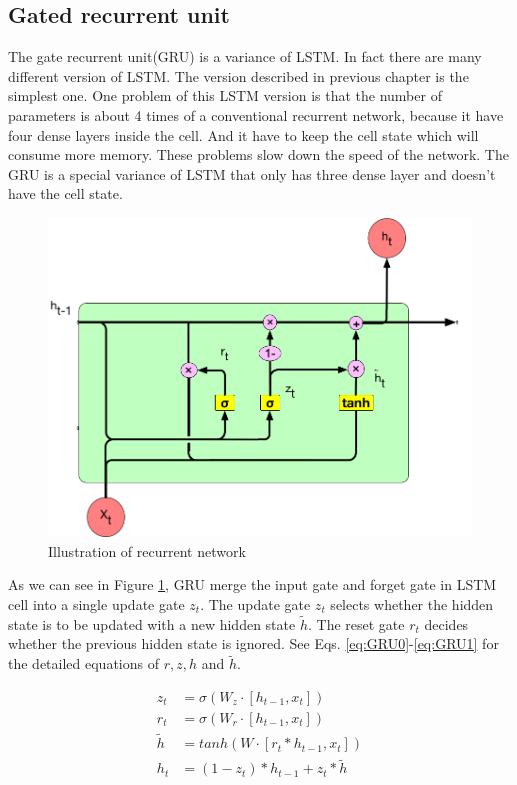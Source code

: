 \par


\subsection{Gated recurrent unit}
\par
The gate recurrent unit(GRU)\cite{cho2014learning} is a variance of LSTM. In fact there are many different version of LSTM. The version described in previous chapter is the simplest one. One problem of this LSTM version is that the number of parameters is about 4 times of a conventional recurrent network, because it have four dense layers inside the cell. And it have to keep the cell state which will consume more memory. These problems slow down the speed of the network. The GRU is a special variance of LSTM that only has three dense layer and doesn't have the cell state.\par

\begin{figure}[h] 
	\centering
	\includegraphics[width=6.0in]{Figures/recurrent5}
	\caption[unrolled recurrent network]{Illustration of recurrent network}
	\label{fig:4}
\end{figure}

As we can see in Figure \ref{fig:4}, GRU merge the input gate and forget gate in LSTM cell into a single update gate $z_t$. The update gate $z_t$ selects whether the hidden state is to be updated with
a new hidden state $\tilde{h}$. The reset gate $r_t$ decides whether the previous hidden state is ignored. See Eqs. \ref{eq:GRU0}-\ref{eq:GRU1} for the detailed equations of $r, z, h$ and $\tilde{h}$.

\begin{subequations} 
    \begin{align}
    	z_t &= \sigma(W_z\cdot [h_{t-1}, x_t]) \label{eq:GRU0}\\ 
        r_t &= \sigma(W_r\cdot [h_{t-1}, x_t]) \label{eq:GRU1}\\
        \tilde{h} &= tanh(W\cdot [r_t\ast h_{t-1}, x_t]) \label{eq:GRU2}\\
        h_t &= (1 -z_t)\ast h_{t-1} + z_t\ast \tilde{h} \label{eq:GRU3}
    \end{align}	
\end{subequations}